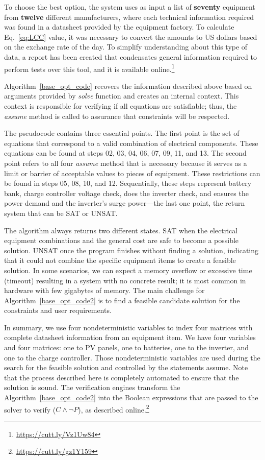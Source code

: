 \documentclass[10pt,journal,compsoc]{IEEEtran}
\begin{document}
To choose the best option, the system uses as input a list of \textbf{seventy} equipment from \textbf{twelve} different manufacturers, where each technical information required was found in a datasheet provided by the equipment factory. To calculate Eq.~\eqref{eq:LCC} value, it was necessary to convert the amounts to US dollars based on the exchange rate of the day. To simplify understanding about this type of data, a report has been created that condensates general information required to perform tests over this tool, and it is available online.\footnote{\href{https://cutt.ly/Vz1Uw84}{https://cutt.ly/Vz1Uw84}}


Algorithm~\ref{base_opt_code} recovers the information described above based on arguments provided by \textit{solve} function and creates an internal context. This context is responsible for verifying if all equations are satisfiable; thus, the \textit{assume} method is called to assurance that constraints will be respected.

The pseudocode contains three essential points. The first point is the set of equations that correspond to a valid combination of electrical components. These equations can be found at steps 02, 03, 04, 06, 07, 09, 11, and 13. The second point refers to all four \textit{assume} method that is necessary because it serves as a limit or barrier of acceptable values to pieces of equipment. These restrictions can be found in steps 05, 08, 10, and 12. Sequentially, these steps represent battery bank, charge controller voltage check, does the inverter check, and ensures the power demand and the inverter's surge power—the last one point, the return system that can be SAT or UNSAT. 

The algorithm always returns two different states. SAT when the electrical equipment combinations and the general cost are safe to become a possible solution.  UNSAT once the program finishes without finding a solution, indicating that it could not combine the specific equipment items to create a feasible solution. In some scenarios, we can expect a memory overflow or excessive time (timeout) resulting in a system with no concrete result; it is most common in hardware with few gigabytes of memory. The main challenge for Algorithm~\ref{base_opt_code2} is to find a feasible candidate solution for the constraints and user requirements.

\color{black}
In summary, we use four nondeterministic variables to index four matrices with complete datasheet information from an equipment item. We have four variables and four matrices: one to PV panels, one to batteries, one to the inverter, and one to the charge controller. Those nondeterministic variables are used during the search for the feasible solution and controlled by the statements assume. Note that the process described here is completely automated to ensure that the solution is sound. The verification engines transform the Algorithm~\ref{base_opt_code2} into the Boolean expressions that are passed to the solver to verify ($C \wedge \neg P$), as described online.\footnote{\href{https://cutt.ly/gz1Y159}{https://cutt.ly/gz1Y159}}
\end{document}
